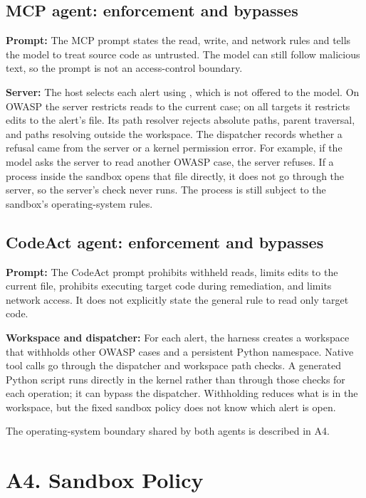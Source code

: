 \documentclass[11pt,letterpaper]{article}
\newcommand{\code}[1]{\texttt{\detokenize{#1}}}
\begin{document}
\subsection*{MCP agent: enforcement and bypasses}

\textbf{Prompt:} The MCP prompt states the read, write, and network rules and tells the model to treat source code as untrusted. The model can still follow malicious text, so the prompt is not an access-control boundary.

\textbf{Server:} The host selects each alert using \code{set_alert}, which is not offered to the model. On OWASP the server restricts reads to the current case; on all targets it restricts edits to the alert's file. Its path resolver rejects absolute paths, parent traversal, and paths resolving outside the workspace. The dispatcher records whether a refusal came from the server or a kernel permission error. For example, if the model asks the server to read another OWASP case, the server refuses. If a process inside the sandbox opens that file directly, it does not go through the server, so the server's check never runs. The process is still subject to the sandbox's operating-system rules.

\subsection*{CodeAct agent: enforcement and bypasses}

\textbf{Prompt:} The CodeAct prompt prohibits withheld reads, limits edits to the current file, prohibits executing target code during remediation, and limits network access. It does not explicitly state the general rule to read only target code.

\textbf{Workspace and dispatcher:} For each alert, the harness creates a workspace that withholds other OWASP cases and a persistent Python namespace. Native tool calls go through the dispatcher and workspace path checks. A generated Python script runs directly in the kernel rather than through those checks for each operation; it can bypass the dispatcher. Withholding reduces what is in the workspace, but the fixed sandbox policy does not know which alert is open.

The operating-system boundary shared by both agents is described in A4.

\section*{A4. Sandbox Policy}
\end{document}

